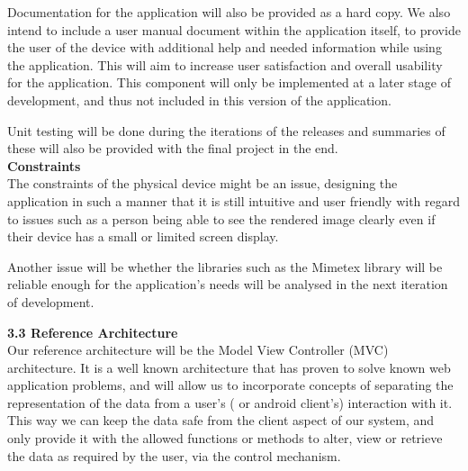 \documentclass[29pt,a4paper]{moderncv}
\begin{document}
				Documentation for the application will also be provided as a hard copy.  We also intend to include a user manual document within the application itself, to provide the user of the device with additional help and needed information while using the application. This will aim to increase user satisfaction and overall usability for the application.  This component will only be implemented at a later stage of development, and thus not included in this version of the application.
				
				Unit testing will be done during the iterations of the releases and summaries of these will also be provided with the final project in the end.\\
				
			
			\noindent\textbf{Constraints}
				\\The constraints of the physical device might be an issue, designing the application in such a manner that it is still intuitive and user friendly with regard to issues such as a person being able to see the rendered image clearly even if their device has a small or limited screen display.
				
				Another issue will be whether the libraries such as the Mimetex library will be reliable enough for the application’s needs will be analysed in the next iteration of development.
		\vspace{5mm}
		
		\noindent \textbf{3.3 Reference Architecture}
			\\Our reference architecture will be the Model View Controller (MVC) architecture. It is a well known architecture that has proven to solve known web application problems, and will allow us to incorporate concepts of separating the representation of the data from a user’s ( or android client’s) interaction with it.  This way we can keep the data safe from the client aspect of our system, and only provide it with the allowed functions or methods to alter, view or retrieve the data as required by the user, via the control mechanism.\\
			
\end{document}
